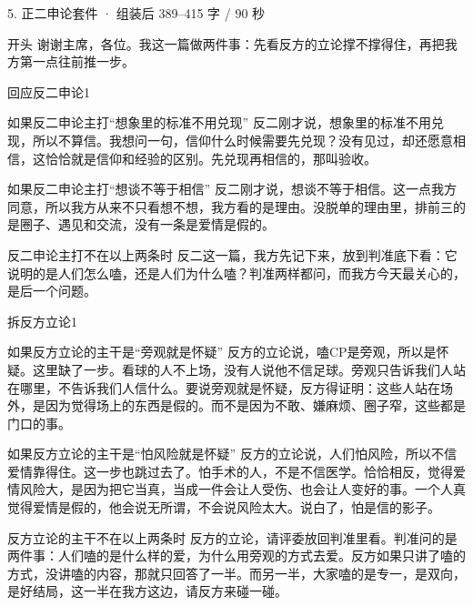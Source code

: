 \documentclass[script,pro]{debate}
\begin{document}
\begin{kit}{5. 正二申论}{套件 · 组装后 389–415 字 / 90 秒}
\begin{fixed}{开头}
谢谢主席，各位。我这一篇做两件事：先看反方的立论撑不撑得住，再把我方第一点往前推一步。
\end{fixed}
\begin{pick}{回应反二申论}{1}
\begin{module}{如果反二申论主打“想象里的标准不用兑现”}
反二刚才说，想象里的标准不用兑现，所以不算信。我想问一句，信仰什么时候需要先兑现？没有见过，却还愿意相信，这恰恰就是信仰和经验的区别。先兑现再相信的，那叫验收。
\end{module}
\begin{module}{如果反二申论主打“想谈不等于相信”}
反二刚才说，想谈不等于相信。这一点我方同意，所以我方从来不只看想不想，我方看的是理由。没脱单的理由里，排前三的是圈子、遇见和交流，没有一条是爱情是假的。
\end{module}
\begin{fallback}{反二申论主打不在以上两条时}
反二这一篇，我方先记下来，放到判准底下看：它说明的是人们怎么嗑，还是人们为什么嗑？判准两样都问，而我方今天最关心的，是后一个问题。
\end{fallback}
\end{pick}
\begin{pick}{拆反方立论}{1}
\begin{module}{如果反方立论的主干是“旁观就是怀疑”}
反方的立论说，嗑CP是旁观，所以是怀疑。这里缺了一步。看球的人不上场，没有人说他不信足球。旁观只告诉我们人站在哪里，不告诉我们人信什么。要说旁观就是怀疑，反方得证明：这些人站在场外，是因为觉得场上的东西是假的。而不是因为不敢、嫌麻烦、圈子窄，这些都是门口的事。
\end{module}
\begin{module}{如果反方立论的主干是“怕风险就是怀疑”}
反方的立论说，人们怕风险，所以不信爱情靠得住。这一步也跳过去了。怕手术的人，不是不信医学。恰恰相反，觉得爱情风险大，是因为把它当真，当成一件会让人受伤、也会让人变好的事。一个人真觉得爱情是假的，他会说无所谓，不会说风险太大。说白了，怕是信的影子。
\end{module}
\begin{fallback}{反方立论的主干不在以上两条时}
反方的立论，请评委放回判准里看。判准问的是两件事：人们嗑的是什么样的爱，为什么用旁观的方式去爱。反方如果只讲了嗑的方式，没讲嗑的内容，那就只回答了一半。而另一半，大家嗑的是专一，是双向，是好结局，这一半在我方这边，请反方来碰一碰。
\end{fallback}

\end{pick}
\end{kit}
\end{document}
